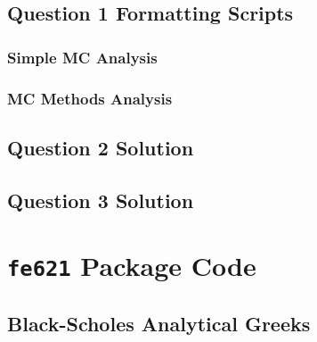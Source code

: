 \documentclass[10pt]{article}
\newcommand*\lstinputpath[1]{\lstset{inputpath=#1}} %
\begin{document}
    \subsection{Question 1 Formatting Scripts}
        \subsubsection{Simple MC Analysis}
            

        \subsubsection{MC Methods Analysis}
        

    \subsection{Question 2 Solution} \label{appendix:source:q2}
        
    
    \subsection{Question 3 Solution} \label{appendix:source:q3}
        

\newpage
\section{\texttt{fe621} Package Code} \label{appendix:fe621}
\lstinputpath{..}
    \subsection{Black-Scholes Analytical Greeks} \label{appendix:fe621:bs_greeks}
        

\end{document}
